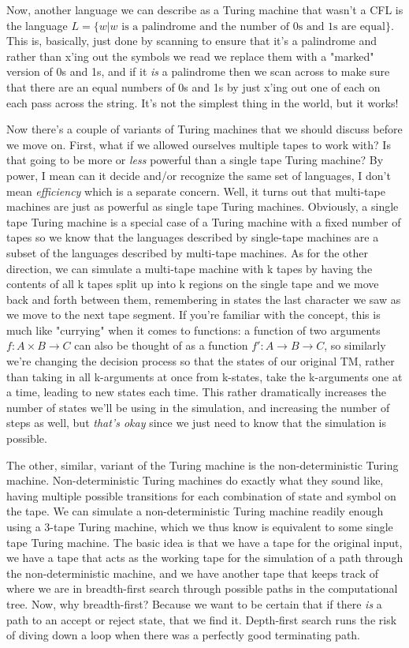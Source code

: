 \documentclass[11pt]{article}
\begin{document}
Now, another language we can describe as a Turing machine that wasn't a CFL is the language $L = \{ w | w \text{ is a palindrome and the number of 0s and 1s are equal}\}$. This is, basically, just done by scanning to ensure that it's a palindrome and rather than x'ing out the symbols we read we replace them with a "marked" version of 0s and 1s, and if it \emph{is} a palindrome then we scan across to make sure that there are an equal numbers of 0s and 1s by just x'ing out one of each on each pass across the string. It's not the simplest thing in the world, but it works!

Now there's a couple of variants of Turing machines that we should discuss before we move on. First, what if we allowed ourselves multiple tapes to work with? Is that going to be more or \emph{less} powerful than a single tape Turing machine? By power, I mean can it decide and/or recognize the same set of languages, I don't mean \emph{efficiency} which is a separate concern. Well, it turns out that multi-tape machines are just as powerful as single tape Turing machines. Obviously, a single tape Turing machine is a special case of a Turing machine with a fixed number of tapes so we know that the languages described by single-tape machines are a subset of the languages described by multi-tape machines. As for the other direction, we can simulate a multi-tape machine with k tapes by having the contents of all k tapes split up into k regions on the single tape and we move back and forth between them, remembering in states the last character we saw as we move to the next tape segment. If you're familiar with the concept, this is much like "currying" when it comes to functions: a function of two arguments $f : A \times B \to C$ can also be thought of as a function $f' : A \to B \to C$, so similarly we're changing the decision process so that the states of our original TM, rather than taking in all k-arguments at once from k-states, take the k-arguments one at a time, leading to new states each time. This rather dramatically increases the number of states we'll be using in the simulation, and increasing the number of steps as well, but \emph{that's okay} since we just need to know that the simulation is possible. 

The other, similar, variant of the Turing machine is the non-deterministic Turing machine. Non-deterministic Turing machines do exactly what they sound like, having multiple possible transitions for each combination of state and symbol on the tape. We can simulate a non-deterministic Turing machine readily enough using a 3-tape Turing machine, which we thus know is equivalent to some single tape Turing machine. The basic idea is that we have a tape for the original input, we have a tape that acts as the working tape for the simulation of a path through the non-deterministic machine, and we have another tape that keeps track of where we are in breadth-first search through possible paths in the computational tree. Now, why breadth-first? Because we want to be certain that if there \emph{is} a path to an accept or reject state, that we find it. Depth-first search runs the risk of diving down a loop when there was a perfectly good terminating path.
\end{document}
